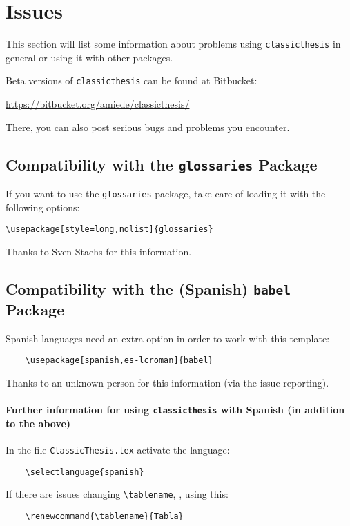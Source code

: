 
\section{Issues}\label{sec:issues}
This section will list some information about problems using \texttt{classic\-thesis} in general or using it with other packages.

Beta versions of \texttt{classicthesis} can be found at Bitbucket:
\begin{center}
    \url{https://bitbucket.org/amiede/classicthesis/}
\end{center}
There, you can also post serious bugs and problems you encounter.

\subsection*{Compatibility with the \texttt{glossaries} Package}
If you want to use the \texttt{glossaries} package, take care of loading it with the following options:
\begin{verbatim}
\usepackage[style=long,nolist]{glossaries}
\end{verbatim}

\noindent Thanks to Sven Staehs for this information. 

\subsection*{Compatibility with the (Spanish) \texttt{babel} Package}
Spanish languages need an extra option in order to work with this template:
\begin{lstlisting}
    \usepackage[spanish,es-lcroman]{babel}
\end{lstlisting}
Thanks to an unknown person for this information (via the issue reporting). 

\paragraph{Further information for using \texttt{classicthesis} with Spanish (in addition to the above)}
In the file \texttt{ClassicThesis.tex} activate the language: 
\begin{lstlisting}
    \selectlanguage{spanish}
\end{lstlisting}

If there are issues changing \verb|\tablename|, \eg, using this:
\begin{lstlisting}
    \renewcommand{\tablename}{Tabla}
\end{lstlisting}

